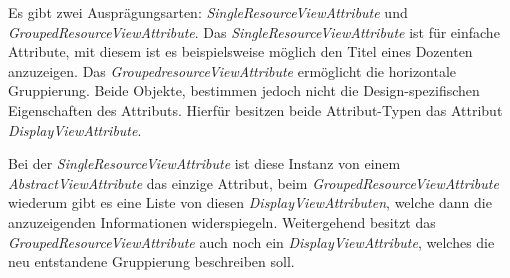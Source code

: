 Es gibt zwei Ausprägungsarten: \textit{SingleResourceViewAttribute} und \textit{GroupedResourceViewAttribute}.  Das \textit{SingleResourceViewAttribute} ist für einfache Attribute, mit diesem ist es beispielsweise möglich den Titel eines Dozenten anzuzeigen. Das \textit{GroupedresourceViewAttribute} ermöglicht die horizontale Gruppierung. Beide Objekte, bestimmen jedoch nicht die Design-spezifischen Eigenschaften des Attributs. Hierfür besitzen beide Attribut-Typen das Attribut \textit{DisplayViewAttribute}.

Bei der \textit{SingleResourceViewAttribute} ist diese Instanz von einem \textit{AbstractViewAttribute} das einzige Attribut, beim \textit{GroupedResourceViewAttribute} wiederum gibt es eine Liste von diesen \textit{DisplayViewAttributen}, welche dann die anzuzeigenden Informationen widerspiegeln. Weitergehend besitzt das \textit{GroupedResourceViewAttribute} auch noch ein \textit{DisplayViewAttribute}, welches die neu entstandene Gruppierung beschreiben soll.

\newpage

